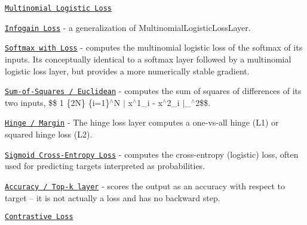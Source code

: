 \begin{DoxyItemize}
\item \href{layers/multinomiallogisticloss.html}{\tt Multinomial Logistic Loss}
\item \href{layers/infogainloss.html}{\tt Infogain Loss} -\/ a generalization of Multinomial\+Logistic\+Loss\+Layer.
\item \href{layers/softmaxwithloss.html}{\tt Softmax with Loss} -\/ computes the multinomial logistic loss of the softmax of its inputs. It\textquotesingle{}s conceptually identical to a softmax layer followed by a multinomial logistic loss layer, but provides a more numerically stable gradient.
\item \href{layers/euclideanloss.html}{\tt Sum-\/of-\/\+Squares / Euclidean} -\/ computes the sum of squares of differences of its two inputs, \$\$ 1 \{2N\} \{i=1\}$^\wedge$N $|$ x$^\wedge$1\+\_\+i -\/ x$^\wedge$2\+\_\+i $|$\+\_$^\wedge$2\$\$.
\item \href{layers/hingeloss.html}{\tt Hinge / Margin} -\/ The hinge loss layer computes a one-\/vs-\/all hinge (L1) or squared hinge loss (L2).
\item \href{layers/sigmoidcrossentropyloss.html}{\tt Sigmoid Cross-\/\+Entropy Loss} -\/ computes the cross-\/entropy (logistic) loss, often used for predicting targets interpreted as probabilities.
\item \href{layers/accuracy.html}{\tt Accuracy / Top-\/k layer} -\/ scores the output as an accuracy with respect to target -- it is not actually a loss and has no backward step.
\item \href{layers/contrastiveloss.html}{\tt Contrastive Loss} 
\end{DoxyItemize}